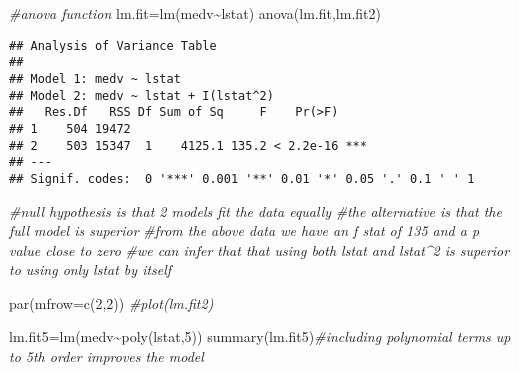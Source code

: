 \documentclass[
]{article}
\newenvironment{Shaded}{\begin{snugshade}}{\end{snugshade}}
\newcommand{\AttributeTok}[1]{\textcolor[rgb]{0.77,0.63,0.00}{#1}}
\newcommand{\CommentTok}[1]{\textcolor[rgb]{0.56,0.35,0.01}{\textit{#1}}}
\newcommand{\DecValTok}[1]{\textcolor[rgb]{0.00,0.00,0.81}{#1}}
\newcommand{\FunctionTok}[1]{\textcolor[rgb]{0.00,0.00,0.00}{#1}}
\newcommand{\NormalTok}[1]{#1}
\newcommand{\OtherTok}[1]{\textcolor[rgb]{0.56,0.35,0.01}{#1}}
\newcommand{\SpecialCharTok}[1]{\textcolor[rgb]{0.00,0.00,0.00}{#1}}
\begin{document}
\begin{Shaded}
\begin{Highlighting}[]
\CommentTok{\#anova function}
\NormalTok{lm.fit}\OtherTok{=}\FunctionTok{lm}\NormalTok{(medv}\SpecialCharTok{\textasciitilde{}}\NormalTok{lstat)}
\FunctionTok{anova}\NormalTok{(lm.fit,lm.fit2)}
\end{Highlighting}
\end{Shaded}

\begin{verbatim}
## Analysis of Variance Table
## 
## Model 1: medv ~ lstat
## Model 2: medv ~ lstat + I(lstat^2)
##   Res.Df   RSS Df Sum of Sq     F    Pr(>F)    
## 1    504 19472                                 
## 2    503 15347  1    4125.1 135.2 < 2.2e-16 ***
## ---
## Signif. codes:  0 '***' 0.001 '**' 0.01 '*' 0.05 '.' 0.1 ' ' 1
\end{verbatim}

\begin{Shaded}
\begin{Highlighting}[]
\CommentTok{\#null hypothesis is that 2 models fit the data equally}
\CommentTok{\#the alternative is that the full model is superior}
\CommentTok{\#from the above data we have an f stat of 135 and a p value close to zero}
\CommentTok{\#we can infer that that using both lstat and lstat\^{}2 is superior to using only lstat by itself}
\end{Highlighting}
\end{Shaded}

\begin{Shaded}
\begin{Highlighting}[]
\FunctionTok{par}\NormalTok{(}\AttributeTok{mfrow=}\FunctionTok{c}\NormalTok{(}\DecValTok{2}\NormalTok{,}\DecValTok{2}\NormalTok{))}
\CommentTok{\#plot(lm.fit2)}
\end{Highlighting}
\end{Shaded}

\begin{Shaded}
\begin{Highlighting}[]
\NormalTok{lm.fit5}\OtherTok{=}\FunctionTok{lm}\NormalTok{(medv}\SpecialCharTok{\textasciitilde{}}\FunctionTok{poly}\NormalTok{(lstat,}\DecValTok{5}\NormalTok{))}
\FunctionTok{summary}\NormalTok{(lm.fit5)}\CommentTok{\#including polynomial terms up to 5th order improves the model}
\end{Highlighting}
\end{Shaded}
\end{document}
